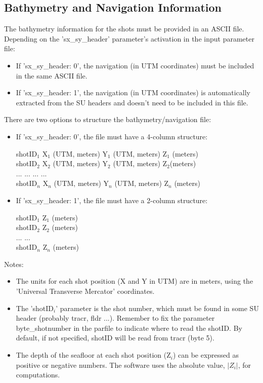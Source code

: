 \documentclass[11pt, oneside]{article}   	%
\begin{document}
\subsection{Bathymetry and Navigation Information}\label{sec4b}

The bathymetry information for the shots must be provided in an ASCII file. Depending on the 'sx\_sy\_header' parameter's activation in the input parameter file:

\begin{itemize}
  \item If 'sx\_sy\_header: 0', the navigation (in UTM coordinates) must be included in the same ASCII file.
  \item If 'sx\_sy\_header: 1', the navigation (in UTM coordinates) is automatically extracted from the SU headers and doesn't need to be included in this file.
\end{itemize}

There are two options to structure the bathymetry/navigation file:

\begin{itemize}
  \item If 'sx\_sy\_header: 0', the file must have a 4-column structure:

  shotID$_1$   X$_1$ (UTM, meters)   Y$_1$ (UTM, meters)   Z$_1$ (meters) \\
  shotID$_2$   X$_2$ (UTM, meters)   Y$_2$ (UTM, meters)   Z$_2$(meters) \\ 
  ...        ...                 ...                 ... \\
  shotID$_n$  X$_n$ (UTM, meters)   Y$_n$ (UTM, meters)   Z$_n$ (meters) 

\item If 'sx\_sy\_header: 1', the file must have a 2-column structure:

  shotID$_1$   Z$_1$ (meters) \\
  shotID$_2$  Z$_2$ (meters) \\
  ...        ... \\
  shotID$_n$   Z$_n$ (meters) 

\end{itemize}

Notes:
\begin{itemize}
  \item The units for each shot position (X and Y in UTM) are in meters, using the 'Universal Transverse Mercator' coordinates.
  \item The 'shotID$_i$' parameter is the shot number, which must be found in some SU header (probably tracr, fldr ...). Remember to fix the parameter byte\_shotnumber in the parfile to indicate where to read the shotID. By default, if not specified, shotID will be read from tracr (byte 5).
  \item The depth of the seafloor at each shot position (Z$_i$) can be expressed as positive or negative numbers. The software uses the absolute value, $|Z_i|$, for computations.
\end{itemize}
\end{document}
